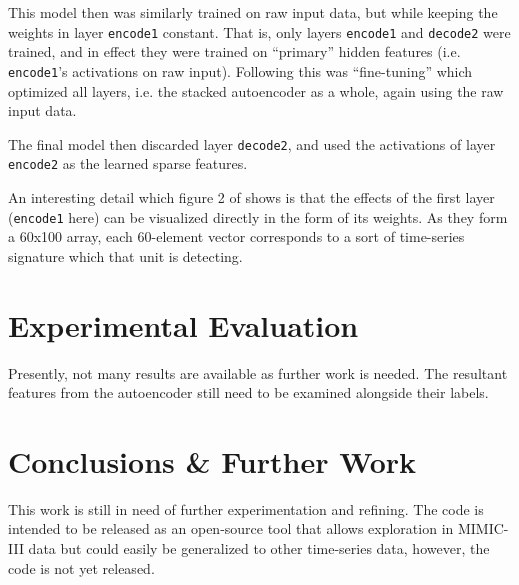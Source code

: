 \documentclass[journal]{IEEEtran}
\begin{document}
This model then was similarly trained on raw input data, but while
keeping the weights in layer \texttt{encode1} constant.  That is, only
layers \texttt{encode1} and \texttt{decode2} were trained, and in
effect they were trained on ``primary'' hidden features
(i.e. \texttt{encode1}'s activations on raw input).  Following this
was ``fine-tuning''\cite{Ng} which optimized all layers, i.e. the
stacked autoencoder as a whole, again using the raw input data.

The final model then discarded layer \texttt{decode2}, and used the
activations of layer \texttt{encode2} as the learned sparse features.

An interesting detail which figure 2 of \cite{Lasko2013} shows is that
the effects of the first layer (\texttt{encode1} here) can be
visualized directly in the form of its weights.  As they form a 60x100
array, each 60-element vector corresponds to a sort of time-series
signature which that unit is detecting.


\section{Experimental Evaluation}

Presently, not many results are available as further work is needed.
The resultant features from the autoencoder still need to be examined
alongside their labels.

\section{Conclusions \& Further Work}

This work is still in need of further experimentation and refining.
The code is intended to be released as an open-source tool that allows
exploration in MIMIC-III data but could easily be generalized to other
time-series data, however, the code is not yet released.
\end{document}
